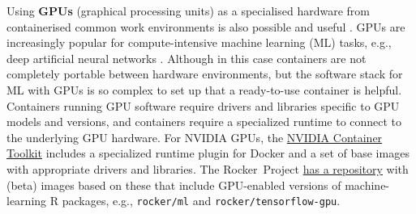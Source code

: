 \label{rocker-gpu} Using \textbf{GPUs} (graphical processing units) as a
specialised hardware from containerised common work environments is also
possible and useful \citep{haydel_enhancing_2015}. GPUs are increasingly
popular for compute-intensive machine learning (ML) tasks, e.g., deep
artificial neural networks \citep{schmidhuber_deep_2015}. Although in
this case containers are not completely portable between hardware
environments, but the software stack for ML with GPUs is so complex to
set up that a ready-to-use container is helpful. Containers running GPU
software require drivers and libraries specific to GPU models and
versions, and containers require a specialized runtime to connect to the
underlying GPU hardware. For NVIDIA GPUs, the
\href{https://github.com/NVIDIA/nvidia-docker}{NVIDIA Container Toolkit}
includes a specialized runtime plugin for Docker and a set of base
images with appropriate drivers and libraries. The Rocker~Project
\href{https://github.com/rocker-org/ml}{has a repository} with (beta)
images based on these that include GPU-enabled versions of
machine-learning R packages, e.g., \texttt{rocker/ml} and
\texttt{rocker/tensorflow-gpu}.

